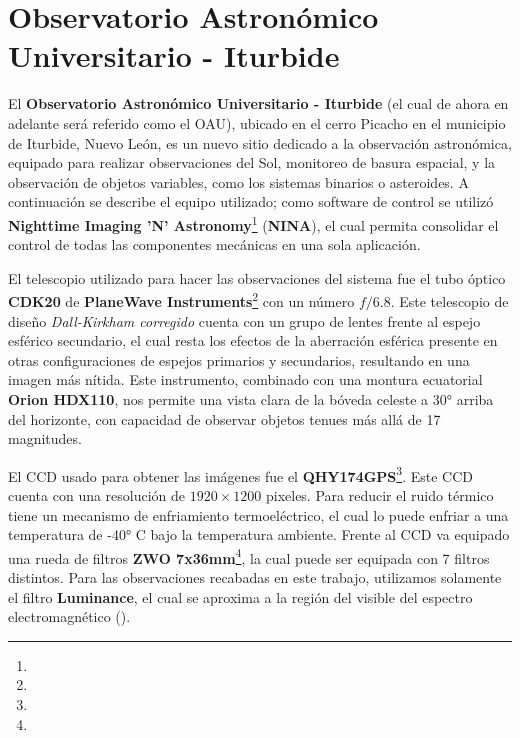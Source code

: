 \section{Observatorio Astronómico Universitario - Iturbide}

El \textbf{Observatorio Astronómico Universitario - Iturbide} (el cual de ahora
en adelante será referido como el OAU), ubicado en el cerro Picacho en el
municipio de Iturbide, Nuevo León, es un nuevo sitio dedicado a la observación
astronómica, equipado para realizar observaciones del Sol, monitoreo de basura
espacial, y la observación de objetos variables, como los sistemas binarios o
asteroides. A continuación se describe el equipo utilizado; como software de
control se utilizó \textbf{Nighttime Imaging 'N'
Astronomy}\footnote{} (\textbf{NINA}), el cual
permita consolidar el control de todas las componentes mecánicas en una sola
aplicación. 

El telescopio utilizado para hacer las observaciones del sistema fue el tubo
óptico \textbf{CDK20} de \textbf{PlaneWave
Instruments}\footnote{} con un
número $f/6.8$. Este telescopio de diseño \textit{Dall-Kirkham corregido} cuenta
con un grupo de lentes frente al espejo esférico secundario, el cual resta los
efectos de la aberración esférica presente en otras configuraciones de espejos
primarios y secundarios, resultando en una imagen más nítida. Este instrumento,
combinado con una montura ecuatorial \textbf{Orion HDX110}, nos permite una
vista clara de la bóveda celeste a \ang{30} arriba del horizonte, con capacidad
de observar objetos tenues más allá de 17 magnitudes.

El CCD usado para obtener las imágenes fue el
\textbf{QHY174GPS}\footnote{}.
Este CCD cuenta con una resolución de $1920 \times 1200$ pixeles. Para reducir
el ruido térmico tiene un mecanismo de enfriamiento termoeléctrico, el cual lo
puede enfriar a una temperatura de -\ang{40} C bajo la temperatura ambiente.
Frente al CCD va equipado una rueda de filtros \textbf{ZWO
7x36mm}\footnote{},
la cual puede ser equipada con 7 filtros distintos. Para las observaciones
recabadas en este trabajo, utilizamos solamente el filtro \textbf{Luminance}, el
cual se aproxima a la región del visible del espectro electromagnético
(). 

